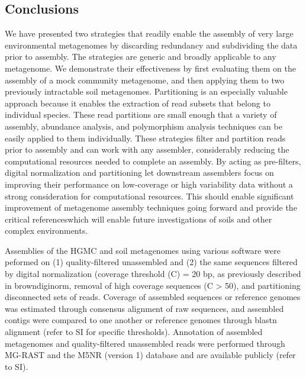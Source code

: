 \documentclass{pnastwo}
\begin{document}
\begin{article}
\subsection{Conclusions}
We have presented two strategies that readily enable the assembly of very large
environmental metagenomes by discarding redundancy and subdividing the data
prior to assembly. The strategies are generic and broadly applicable to any
metagenome. We demonstrate their effectiveness by first evaluating them on the
assembly of a mock community metagenome, and then applying them to two
previously intractable soil metagenomes. Partitioning is an especially valuable
approach because it enables the extraction of read subsets that belong to
individual species. These read partitions are small enough that a variety of
assembly, abundance analysis, and polymorphism analysis techniques can be easily
applied to them individually. These strategies filter and partition reads prior
to assembly and can work with any assembler, considerably reducing the
computational resources needed to complete an assembly. By acting as
pre-filters, digital normalization and partitioning let downstream assemblers
focus on improving their performance on low-coverage or high variability data
without a strong consideration for computational resources. This should enable
significant improvement of metagenome assembly techniques going forward and
provide the critical referenceswhich will enable future investigations of soils
and other complex environments. \begin{materials} Assemblies of the HGMC and
soil metagenomes using various software were peformed on (1) quality-filtered
unassembled and (2) the same sequences filtered by digital normalization
(coverage threshold (C) = 20 bp, as previously described in browndiginorm,
removal of high coverage sequences (C > 50), and partitioning disconnected sets
of reads. Coverage of assembled sequences or reference genomes was estimated
through consensus alignment of raw sequences, and assembled contigs were
compared to one another or reference genomes through blastn alignment (refer to
SI for specific thresholds). Annotation of assembled metagenomes and
quality-filtered unassembled reads were performed through MG-RAST and the M5NR
(version 1) database and are available publicly (refer to SI). \end{materials}



\end{article}
\end{document}
